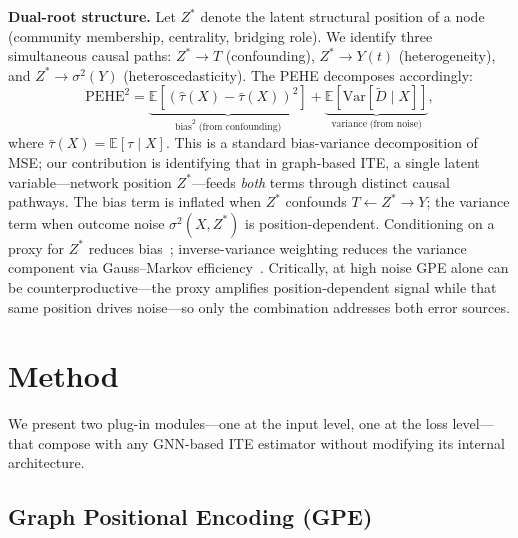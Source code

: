 \documentclass[sigconf,anonymous,review]{acmart}
\begin{document}
\textbf{Dual-root structure.} Let $Z^*$ denote the latent structural position of a node (community membership, centrality, bridging role). We identify three simultaneous causal paths: $Z^* \to T$ (confounding), $Z^* \to Y(t)$ (heterogeneity), and $Z^* \to \sigma^2(Y)$ (heteroscedasticity). The PEHE decomposes accordingly:
\begin{equation}\label{eq:pehe_decomp}
    \mathrm{PEHE}^2 = \underbrace{\mathbb{E}\!\left[(\hat{\tau}(X) - \bar{\tau}(X))^2\right]}_{\text{bias}^2\;\text{(from confounding)}} + \underbrace{\mathbb{E}\!\left[\mathrm{Var}[\tilde{D} \mid X]\right]}_{\text{variance}\;\text{(from noise)}},
\end{equation}
where $\bar{\tau}(X) = \mathbb{E}[\tau \mid X]$. This is a standard bias-variance decomposition of MSE; our contribution is identifying that in graph-based ITE, a single latent variable---network position $Z^*$---feeds \emph{both} terms through distinct causal pathways. The bias term is inflated when $Z^*$ confounds $T \leftarrow Z^* \to Y$; the variance term when outcome noise $\sigma^2(X, Z^*)$ is position-dependent. Conditioning on a proxy for $Z^*$ reduces bias~\cite{veitch2019using}; inverse-variance weighting reduces the variance component via Gauss--Markov efficiency~\cite{Aitken_1936}. Critically, at high noise GPE alone can be counterproductive---the proxy amplifies position-dependent signal while that same position drives noise---so only the combination addresses both error sources.

\section{Method}\label{sec:method}

We present two plug-in modules---one at the input level, one at the loss level---that compose with any GNN-based ITE estimator without modifying its internal architecture.

\subsection{Graph Positional Encoding (GPE)}\label{sec:gpe}
\end{document}
